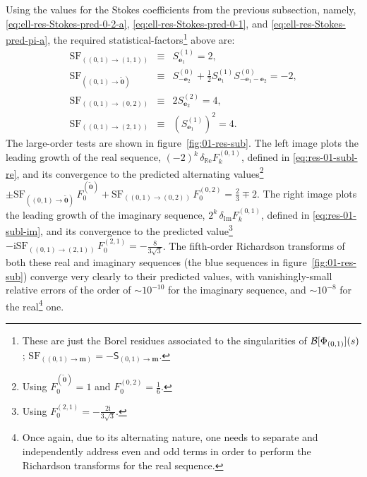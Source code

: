 \documentclass[11pt,a4paper]{article}
\newcommand{\CB}{{\cal B}}
\def\im{{\mathbb{I}}{\mathrm{m}}}
\def\re{{\mathbb{R}}{\mathrm{e}}}
\begin{document}
%
\noindent
Using the values for the Stokes coefficients from the previous subsection, namely, \eqref{eq:ell-res-Stokes-pred-0-2-a}, \eqref{eq:ell-res-Stokes-pred-0-1}, and \eqref{eq:ell-res-Stokes-pred-pi-a}, the required statistical-factors\footnote{These are just the Borel residues associated to the singularities of $\CB [\Phi_{(0,1)}] (s)$; $\mathrm{SF}_{( (0,1) \rightarrow \boldsymbol{m} )} = - \mathsf{S}_{(0,1) \rightarrow \boldsymbol{m}}$.} above are:
%
\begin{eqnarray}
\mathrm{SF}_{( (0,1) \rightarrow (1,1) )} &\equiv& S^{(1)}_{\boldsymbol{e}_1} = 2, \\
\mathrm{SF}_{( (0,1) \rightarrow \widetilde{\boldsymbol{0}} )} &\equiv& S^{(0)}_{-\boldsymbol{e}_2} + \frac{1}{2} S^{(1)}_{\boldsymbol{e}_1} S^{(0)}_{-\boldsymbol{e}_1-\boldsymbol{e}_2} = - 2, \\
\mathrm{SF}_{( (0,1) \rightarrow (0,2) )} &\equiv& 2 S^{(2)}_{\boldsymbol{e}_2} = 4, \\
\mathrm{SF}_{( (0,1) \rightarrow (2,1) )} &\equiv& \left( S^{(1)}_{\boldsymbol{e}_1} \right)^2 = 4.
\end{eqnarray}
%
\noindent
The large-order tests are shown in figure~\ref{fig:01-res-sub}. The left image plots the leading growth of the real sequence, $(-2)^k\, \delta_{\re} F^{(0,1)}_k$, defined in \eqref{eq:res-01-subl-re}, and its convergence to the predicted alternating values\footnote{Using $F_0^{(\widetilde{\boldsymbol{0}})} = 1$ and $F_0^{(0,2)} = \frac{1}{6}$.} $\pm \mathrm{SF}_{( (0,1) \rightarrow \widetilde{\boldsymbol{0}} )}\, F_0^{(\widetilde{\boldsymbol{0}})} + \mathrm{SF}_{( (0,1) \rightarrow (0,2) )}\, F_0^{(0,2)} = \frac{2}{3} \mp 2$. The right image plots the leading growth of the imaginary sequence, $2^k\, \delta_{\im} F^{(0,1)}_k$, defined in \eqref{eq:res-01-subl-im}, and its convergence to the predicted value\footnote{Using $F_0^{(2,1)} = - \frac{2\mathrm{i}}{3\sqrt{3}}$.} $- \mathrm{i} \mathrm{SF}_{( (0,1) \rightarrow (2,1) )}\, F_0^{(2,1)} = - \frac{8}{3\sqrt{3}}$. The fifth-order Richardson transforms of both these real and imaginary sequences (the blue sequences in figure~\ref{fig:01-res-sub}) converge very clearly to their predicted values, with vanishingly-small relative errors of the order of $\sim 10^{-10}$ for the imaginary sequence, and $\sim 10^{-8}$ for the real\footnote{Once again, due to its alternating nature, one needs to separate and independently address even and odd terms in order to perform the Richardson transforms for the real sequence.} one.
\end{document}
